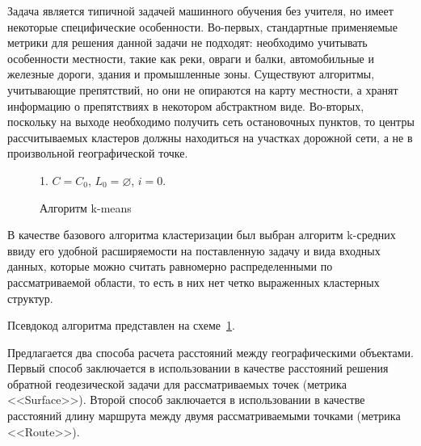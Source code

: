 Задача является типичной задачей машинного обучения без учителя, но имеет некоторые специфические особенности. Во-первых, стандартные применяемые метрики для решения данной задачи не подходят: необходимо учитывать особенности местности, такие как реки, овраги и балки, автомобильные и железные дороги, здания и промышленные зоны. Существуют алгоритмы, учитывающие препятствий, но они не опираются на карту местности, а хранят информацию о препятствиях в некотором абстрактном виде. Во-вторых, поскольку на выходе необходимо получить сеть остановочных пунктов, то центры рассчитываемых кластеров должны находиться на участках дорожной сети, а не в произвольной географической точке.
\begin{figure}[b!]
\vspace*{-1em}
\begin{algorithm}[H]
    1. \( C = C_0 \), \( L_0 = \varnothing \), \( i = 0\). 
\end{algorithm}
\vspace*{-2em}
\caption{Алгоритм k-means}
\label{alg:kmeans}
\end{figure}

В качестве базового алгоритма кластеризации был выбран алгоритм k-средних ввиду его удобной расширяемости на поставленную задачу и вида входных данных, которые можно считать равномерно распределенными по рассматриваемой области, то есть в них нет четко выраженных кластерных структур.

Псевдокод алгоритма представлен на схеме~\ref{alg:kmeans}.

Предлагается два способа расчета расстояний между географическими объектами. Первый способ заключается в использовании в качестве расстояний решения обратной геодезической задачи для рассматриваемых точек (метрика <<Surface>>). Второй способ заключается в использовании в качестве расстояний длину маршрута между двумя рассматриваемыми точками (метрика <<Route>>).

